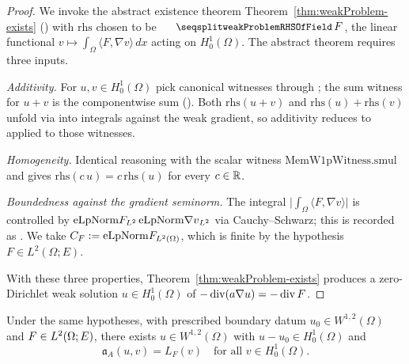\begin{proof}
\leanok
{}

We invoke the abstract existence theorem
Theorem~\ref{thm:weakProblem-exists} () with
$\mathrm{rhs}$ chosen to be $\leanname{weakProblemRHSOfField}\,F$, the
linear functional $v \mapsto \int_{\Omega} \langle F, \nabla v\rangle\,dx$
acting on $H^{1}_{0}(\Omega)$. The abstract theorem requires three inputs.

\emph{Additivity.} For $u, v \in H^{1}_{0}(\Omega)$ pick canonical witnesses
through ; the sum witness for $u + v$ is the
componentwise sum (). Both
$\mathrm{rhs}(u+v)$ and $\mathrm{rhs}(u) + \mathrm{rhs}(v)$ unfold via
 into integrals against the
weak gradient, so additivity reduces to
 applied to those witnesses.

\emph{Homogeneity.} Identical reasoning with the scalar witness
$\mathrm{MemW1pWitness.smul}$ and 
gives $\mathrm{rhs}(c\,u) = c\,\mathrm{rhs}(u)$ for every $c \in \mathbb{R}$.

\emph{Boundedness against the gradient seminorm.} The integral
$\bigl|\int_{\Omega} \langle F, \nabla v\rangle\bigr|$ is controlled by
$\mathrm{eLpNorm}{F}_{L^2}\,\mathrm{eLpNorm}{\nabla v}_{L^2}$ via Cauchy--Schwarz; this is
recorded as . We take
$C_F := \mathrm{eLpNorm}{F}_{L^2(\Omega)}$, which is finite by the hypothesis
$F \in L^2(\Omega; E)$.

With these three properties, Theorem~\ref{thm:weakProblem-exists} produces a
zero-Dirichlet weak solution $u \in H^{1}_{0}(\Omega)$ of
$-\operatorname{div}(a\nabla u) = -\operatorname{div} F$.
\end{proof}

\begin{theorem}
\label{thm:dirichletProblem_exists_of_divergenceData}
\leanok
{}
Under the same hypotheses, with prescribed boundary datum $u_0 \in W^{1,2}(\Omega)$ and $F \in L^{2}(\Omega;E)$, there exists $u \in W^{1,2}(\Omega)$ with $u - u_0 \in H^{1}_{0}(\Omega)$ and
\begin{equation*}
  \mathfrak{a}_A(u, v) = L_F(v) \quad \text{for all } v \in H^{1}_{0}(\Omega).
\end{equation*}
\end{theorem}

